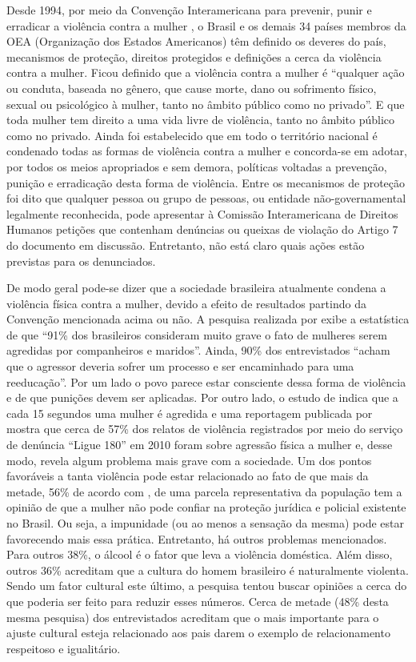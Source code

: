 \documentclass[12pt]{article}
\begin{document}
Desde 1994, por meio da Convenção Interamericana para prevenir, punir e
erradicar a violência
contra a mulher \cite{interamericana}, o Brasil e os demais 34 países membros
da OEA (Organização dos Estados Americanos) têm definido os deveres do
país, mecanismos de proteção, direitos protegidos e definições a cerca da
violência contra a mulher. Ficou definido que a violência contra a mulher
é ``qualquer ação ou conduta, baseada no gênero, que cause morte, dano ou
sofrimento físico, sexual ou psicológico à mulher, tanto no âmbito
público como no privado''. E que toda mulher tem direito a uma vida livre
de violência, tanto no âmbito público como no privado. Ainda foi estabelecido
que em todo o território nacional é condenado todas as formas de
violência contra
a mulher e concorda-se em adotar, por todos os meios apropriados e sem demora,
políticas voltadas a prevenção, punição e erradicação desta forma de violência.
Entre os mecanismos de proteção foi dito que qualquer pessoa ou grupo de
pessoas, ou entidade não-governamental legalmente reconhecida, pode apresentar
à Comissão Interamericana de Direitos Humanos petições que contenham denúncias
ou queixas de violação do Artigo 7 do documento em discussão. Entretanto, não
está claro quais ações estão previstas para os denunciados.

De modo geral pode-se dizer que a sociedade brasileira atualmente condena a
violência física contra a mulher, devido a efeito de resultados partindo
da Convenção mencionada acima ou não. A pesquisa realizada
por \cite{ibope1} exibe a estatística de que ``91\% dos brasileiros
consideram muito grave o fato de mulheres serem agredidas por
companheiros e maridos''. Ainda, 90\% dos entrevistados ``acham que
o agressor deveria sofrer um processo e ser encaminhado para uma
reeducação''. Por um lado o povo parece estar consciente dessa forma
de violência e de que punições devem ser aplicadas. Por outro lado,
o estudo de \cite{avon1} indica que a cada 15 segundos uma mulher é
agredida e uma reportagem publicada por \cite{globo1} mostra que cerca
de 57\% dos relatos de violência registrados por meio do
serviço de denúncia ``Ligue 180'' em 2010 foram sobre
agressão física a mulher e, desse modo, revela algum problema mais grave
com a sociedade. Um dos pontos
favoráveis a tanta violência pode estar relacionado ao fato de que mais
da metade, 56\% de acordo com \cite{avon1}, de uma parcela representativa
da população tem a opinião de que a mulher não pode confiar na proteção
jurídica e policial existente no Brasil.
Ou seja, a impunidade (ou ao menos a sensação da mesma) pode estar
favorecendo mais essa prática.
Entretanto, há outros problemas mencionados. Para outros 38\%, o álcool é o
fator que leva a violência doméstica. Além disso, outros 36\% acreditam que a
cultura do homem brasileiro é naturalmente violenta. Sendo um fator cultural
este último, a pesquisa tentou buscar opiniões a cerca do que poderia
ser feito para reduzir esses números. Cerca de metade
(48\% desta mesma pesquisa) dos entrevistados acreditam que o mais
importante para o ajuste cultural esteja relacionado aos pais darem
o exemplo de relacionamento respeitoso e igualitário.
\end{document}
